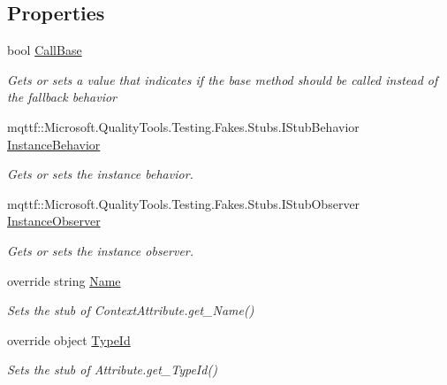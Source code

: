 \subsection*{Properties}
\begin{DoxyCompactItemize}
\item 
bool \hyperlink{class_system_1_1_runtime_1_1_remoting_1_1_contexts_1_1_fakes_1_1_stub_context_attribute_acaddfe639c4d363fdb965bea88e078b9}{Call\-Base}
\begin{DoxyCompactList}\small\item\em Gets or sets a value that indicates if the base method should be called instead of the fallback behavior\end{DoxyCompactList}\item 
mqttf\-::\-Microsoft.\-Quality\-Tools.\-Testing.\-Fakes.\-Stubs.\-I\-Stub\-Behavior \hyperlink{class_system_1_1_runtime_1_1_remoting_1_1_contexts_1_1_fakes_1_1_stub_context_attribute_ad2f8e907f38c9fa9a51d5e4f3b011484}{Instance\-Behavior}
\begin{DoxyCompactList}\small\item\em Gets or sets the instance behavior.\end{DoxyCompactList}\item 
mqttf\-::\-Microsoft.\-Quality\-Tools.\-Testing.\-Fakes.\-Stubs.\-I\-Stub\-Observer \hyperlink{class_system_1_1_runtime_1_1_remoting_1_1_contexts_1_1_fakes_1_1_stub_context_attribute_a1694048299d2bc9cd5f34ab8e5bd95af}{Instance\-Observer}
\begin{DoxyCompactList}\small\item\em Gets or sets the instance observer.\end{DoxyCompactList}\item 
override string \hyperlink{class_system_1_1_runtime_1_1_remoting_1_1_contexts_1_1_fakes_1_1_stub_context_attribute_ad29a027119e3cfb0ec16e986fa78b829}{Name}
\begin{DoxyCompactList}\small\item\em Sets the stub of Context\-Attribute.\-get\-\_\-\-Name()\end{DoxyCompactList}\item 
override object \hyperlink{class_system_1_1_runtime_1_1_remoting_1_1_contexts_1_1_fakes_1_1_stub_context_attribute_a145e31a6108f745a3d2d72ca0432c3a1}{Type\-Id}
\begin{DoxyCompactList}\small\item\em Sets the stub of Attribute.\-get\-\_\-\-Type\-Id()\end{DoxyCompactList}\end{DoxyCompactItemize}


